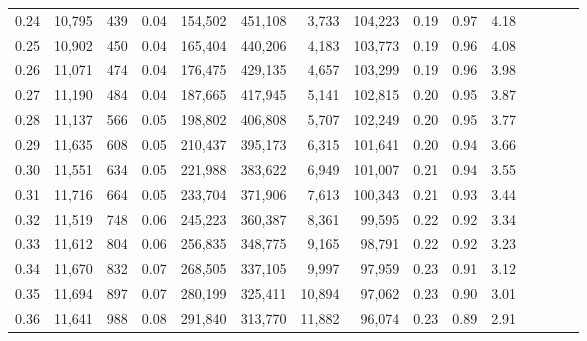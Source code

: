 \begin{tabular}{rrrcrrrrrrrrrrr}
0.24 &  10,795 &    439 &                                       0.04 &  154,502 &  451,108 &    3,733 &  104,223 &  0.19 &  0.97 &                         4.18 \\
0.25 &  10,902 &    450 &                                       0.04 &  165,404 &  440,206 &    4,183 &  103,773 &  0.19 &  0.96 &                         4.08 \\
0.26 &  11,071 &    474 &                                       0.04 &  176,475 &  429,135 &    4,657 &  103,299 &  0.19 &  0.96 &                         3.98 \\
0.27 &  11,190 &    484 &                                       0.04 &  187,665 &  417,945 &    5,141 &  102,815 &  0.20 &  0.95 &                         3.87 \\
0.28 &  11,137 &    566 &                                       0.05 &  198,802 &  406,808 &    5,707 &  102,249 &  0.20 &  0.95 &                         3.77 \\
0.29 &  11,635 &    608 &                                       0.05 &  210,437 &  395,173 &    6,315 &  101,641 &  0.20 &  0.94 &                         3.66 \\
0.30 &  11,551 &    634 &                                       0.05 &  221,988 &  383,622 &    6,949 &  101,007 &  0.21 &  0.94 &                         3.55 \\
0.31 &  11,716 &    664 &                                       0.05 &  233,704 &  371,906 &    7,613 &  100,343 &  0.21 &  0.93 &                         3.44 \\
0.32 &  11,519 &    748 &                                       0.06 &  245,223 &  360,387 &    8,361 &   99,595 &  0.22 &  0.92 &                         3.34 \\
0.33 &  11,612 &    804 &                                       0.06 &  256,835 &  348,775 &    9,165 &   98,791 &  0.22 &  0.92 &                         3.23 \\
0.34 &  11,670 &    832 &                                       0.07 &  268,505 &  337,105 &    9,997 &   97,959 &  0.23 &  0.91 &                         3.12 \\
0.35 &  11,694 &    897 &                                       0.07 &  280,199 &  325,411 &   10,894 &   97,062 &  0.23 &  0.90 &                         3.01 \\
0.36 &  11,641 &    988 &                                       0.08 &  291,840 &  313,770 &   11,882 &   96,074 &  0.23 &  0.89 &                         2.91 \\

\end{tabular}
